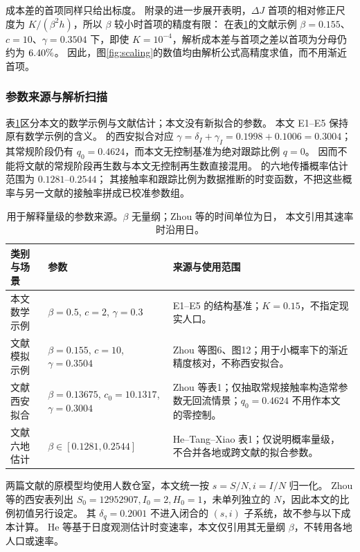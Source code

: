 \documentclass[11pt,a4paper,UTF8]{ctexart}
\theoremstyle{definition}
\begin{document}
成本差的首项同样只给出标度。
附录的进一步展开表明，$\Delta J$ 首项的相对修正尺度为 $K/(\beta^2h)$，所以 $\beta$ 较小时首项的精度有限：
在表\ref{tab:parameter-sources}的文献示例 $\beta=0.155$、$c=10$、$\gamma=0.3504$ 下，即使 $K=10^{-4}$，解析成本差与首项之差以首项为分母仍约为 $6.40\%$。
因此，图\ref{fig:scaling}的数值均由解析公式高精度求值，而不用渐近首项。

\subsubsection{参数来源与解析扫描}
表\ref{tab:parameter-sources}区分本文的数学示例与文献估计；本文没有新拟合的参数。
本文 E1--E5 保持原有数学示例的含义。
\citet[第8节，表1]{Zhou2024SPCI}的西安拟合对应
$\gamma=\delta_I+\gamma_I=0.1998+0.1006=0.3004$；
其常规阶段仍有 $q_0=0.4624$，而本文无控制基准为绝对跟踪比例 $q=0$。
因而不能将文献的常规阶段再生数与本文无控制再生数直接混用。
\citet[表1]{He2023TDINN}的六地传播概率估计范围为 $0.1281$--$0.2544$；
其接触率和跟踪比例为数据推断的时变函数，不把这些概率与另一文献的接触率拼成已校准参数组。
\begin{table}[htbp]
\centering\small
\caption{用于解释量级的参数来源。$\beta$ 无量纲；Zhou 等的时间单位为日，
本文引用其速率时沿用日。}
\label{tab:parameter-sources}
\begin{tabularx}{\linewidth}{@{}>{\raggedright\arraybackslash}p{2.8cm}>{\raggedright\arraybackslash}p{3.7cm}>{\raggedright\arraybackslash}X@{}}
\toprule
类别与场景 & 参数 & 来源与使用范围\\
\midrule
本文数学示例 & $\beta=0.5$, $c=2$, $\gamma=0.3$ & E1--E5 的结构基准；$K=0.15$，不指定现实人口。\\
文献模拟示例 & $\beta=0.155$, $c=10$, $\gamma=0.3504$ & Zhou 等图6、图12；用于小概率下的渐近精度核对，不称西安拟合。\\
文献西安拟合 & $\beta=0.13675$, $c_0=10.1317$, $\gamma=0.3004$ & Zhou 等表1；仅抽取常规接触率构造常参数无回流情景；$q_0=0.4624$ 不用作本文的零控制。\\
文献六地估计 & $\beta\in[0.1281,0.2544]$ & He--Tang--Xiao 表1；仅说明概率量级，不合并各地或跨文献的拟合参数。\\
\bottomrule
\end{tabularx}
\end{table}

两篇文献的原模型均使用人数仓室，本文统一按 $s=S/N,i=I/N$ 归一化。
Zhou 等的西安表列出 $S_0=12952907,I_0=2,H_0=1$，未单列独立的 $N$，因此本文的比例初值另行设定。
其 $\delta_q=0.2001$ 不进入闭合的 $(s,i)$ 子系统，故不参与以下成本计算。
He 等基于日度观测估计时变速率，本文仅引用其无量纲 $\beta$，不转用各地人口或速率。
\end{document}
